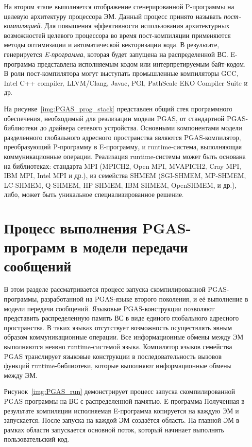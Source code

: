 На втором этапе выполняется отображение сгенерированной P-программы на целевую архитектуру процессора ЭМ. Данный процесс принято называть \textit{пост-компиляцией}. Для повышения эффективности использования архитектурных возможностей целевого процессора во время пост-компиляции применяются методы оптимизации и автоматической векторизации кода. В результате, генерируется \textit{E-программа}, которая будет запущена на распределенной ВС. E-программа представлена исполняемым кодом или интерпретируемым байт-кодом. В роли пост-компилятора могут выступать промышленные компиляторы GCC, Intel C++ compiler, LLVM/Clang, Javac, PGI, PathScale EKO Compiler Suite и др.

На рисунке~\ref{img:PGAS_prog_stack} представлен общий стек программного обеспечения, необходимый для реализации модели PGAS, от стандартной PGAS-библиотеки до драйвера сетевого устройства. Основными компонентами модели разделенного глобального адресного пространства являются PGAS-компилятор, преобразующий P-программу в E-программу, и runtime-система, выполняющая коммуникационные операции. Реализация runtime-системы может быть основана на библиотеках: стандарта MPI (MPICH2, Open MPI, MVAPICH2, Cray MPI, IBM MPI, Intel MPI и др.), из семейства SHMEM (SGI-SHMEM, MP-SHMEM, LC-SHMEM, Q-SHMEM, HP SHMEM, IBM SHMEM, OpenSHMEM, и др.), либо, может быть уникальное специализированное решение.

\section{Процесс выполнения PGAS-программ в модели передачи сообщений}

В этом разделе рассматривается процесс запуска скомпилированной PGAS-программы, разработанной на PGAS-языке второго поколения, и её выполнение в модели передачи сообщений. Языковые PGAS-конструкции позволяют представить распределенную память ВС в виде единого глобального адресного пространства. В таких языках отсутствует возможность осуществлять явным образом коммуникационные операции. Все информационные обмены между ЭМ выполняются неявно runtime-системой языка. Компилятор языков семейства PGAS транслирует языковые конструкции в
последовательность вызовов функций runtime-библиотеки, которые выполняют информационные обмены между ЭМ. 

Рисунок~\ref{img:PGAS_run} демонстрирует процесс запуска скомпилированной PGAS-программы на ВС с распределенной памятью. E-программа Полученная в результате компиляции исполняемая E-программа копируется на каждую ЭМ и запускается. После запуска на каждой ЭМ создаётся область. На главной ЭМ в рамках области запускается основной поток, который начинает выполнять пользовательский код.

